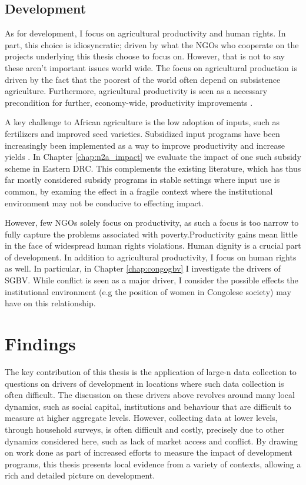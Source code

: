 
\subsection{Development}
As for development, I focus on agricultural productivity and human rights. In part, this choice is idiosyncratic; driven by what the NGOs who cooperate on the projects underlying this thesis choose to focus on. However, that is not to say these aren't important issues world wide. The focus on agricultural production is driven by the fact that the poorest of the world often depend on subsistence agriculture. Furthermore, agricultural productivity is seen as a necessary precondition for further, economy-wide, productivity improvements \citep{WorldBank2008}. 

A key challenge to African agriculture is the low adoption of inputs, such as fertilizers and improved seed varieties. Subsidized input programs have been increasingly been implemented as a way to improve productivity and increase yields \citep[see e.g.][]{Morris2007,WorldBank2000}. In Chapter \ref{chap:n2a_impact} we evaluate the impact of one such subsidy scheme in Eastern DRC. This complements the existing literature, which has thus far mostly considered subsidy programs in stable settings where input use is common, by examing the effect in a fragile context where the institutional environment may not be conducive to effecting impact. 

However, few NGOs solely focus on productivity, as such a focus is too narrow to fully capture the problems associated with poverty.Productivity gains mean little in the face of widespread human rights violations. Human dignity is a crucial part of development. In addition to agricultural productivity, I focus on human rights as well. In particular, in Chapter \ref{chap:congogbv} I investigate the drivers of SGBV. While conflict is seen as a major driver, I consider the possible effects the institutional environment (e.g the position of women in Congolese society) may have on this relationship. 

\section{Findings}
The key contribution of this thesis is the application of large-n data collection to questions on drivers of development in locations where such data collection is often difficult. The discussion on these drivers above revolves around many local dynamics, such as social capital, institutions and behaviour that are difficult to measure at higher aggregate levels. However, collecting data at lower levels, through household surveys, is often difficult and costly, precisely due to other dynamics considered here, such as lack of market access and conflict. By drawing on work done as part of increased efforts to measure the impact of development programs, this thesis presents local evidence from a variety of contexts, allowing a rich and detailed picture on development.

